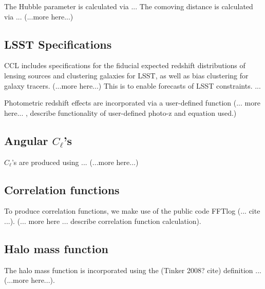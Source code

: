 \documentclass[\docopts]{\docclass}
\begin{document}
The Hubble parameter is calculated via ... The comoving distance is calculated via ... (...more here...)


\subsection{LSST Specifications}
\label{sec:specs}

CCL includes specifications for the fiducial expected redshift distributions of lensing sources and clustering galaxies for LSST, as well as bias clustering for galaxy tracers. (...more here...) This is to enable forecasts of LSST constraints. ... 

Photometric redshift effects are incorporated via a user-defined function (... more here... , describe functionality of user-defined photo-z and equation used.)

\subsection{Angular $C_\ell$'s}
\label{sec:cl}

$C_\ell$'s are produced using ... (...more here...)




\subsection{Correlation functions}
\label{sec:corr}

To produce correlation functions, we make use of the public code FFTlog (... cite ...). (... more here ... describe correlation function calculation).



\subsection{Halo mass function}
\label{sec:hmf}

The halo mass function is incorporated using the (Tinker 2008? cite) definition ... (...more here...).
\end{document}
